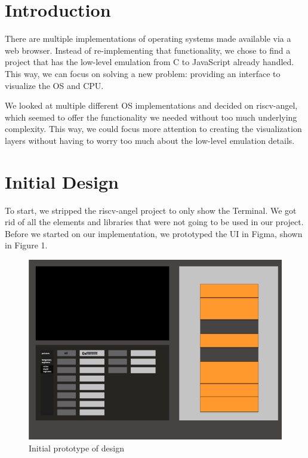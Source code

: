 \section{Introduction}

There are multiple implementations of operating systems made available via a web
browser. Instead of re-implementing that functionality, we chose to find a project that
has the low-level emulation from C to JavaScript already handled. This way, we can
focus on solving a new problem: providing an interface to
visualize the OS and CPU.

We looked at multiple different OS implementations and decided on riscv-angel,
which seemed to offer the
functionality we needed without too much underlying complexity. This way, we could
focus more attention to creating the visualization layers without having to worry
too much about the low-level emulation details.

\section{Initial Design}

To start, we stripped the riscv-angel project to only show the Terminal.
We got rid of all the elements and libraries that were not going to be used in our project.
Before we started on our implementation, we prototyped the UI in Figma, shown in Figure 1.

\begin{figure}[H]
  \includegraphics[scale=0.4]{prototype1}
  \caption{Initial prototype of design}
  \label{fig:proto1}
  \centering
\end{figure}

